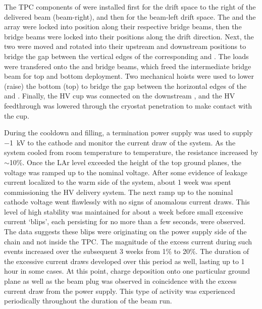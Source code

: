 The TPC components of  were installed first for the drift space to the right of the delivered beam (beam-right), and then for the beam-left drift space.
The  and the  array were locked into position along their respective bridge beams, then the bridge beams were locked into their positions along the drift direction.
Next, the two  were moved and rotated into their upstream and downstream positions to bridge the gap between the vertical edges of the corresponding  and .
The  loads were transfered onto the  and   bridge beams, which freed the intermediate bridge beam for top and bottom  deployment.
Two mechanical hoists were used to lower (raise) the bottom (top)  to bridge the gap between the horizontal edges of the  and .
Finally, the HV cup was connected on the downstream , and the HV feedthrough was lowered through the cryostat penetration to make contact with the cup.

During the cooldown and  filling, a  termination power supply was used to supply $-$\SI{1}{kV} to the cathode and monitor the current draw of the system.
As the system cooled from room temperature to  temperature, the resistance increased by $\sim$10\%.
Once the LAr level exceeded the height of the top ground planes, the voltage was ramped up to the nominal voltage.
After some evidence of leakage current localized to the warm side of the system, about 1 week was spent commissioning the HV delivery system.
The next ramp up to the nominal cathode voltage went flawlessly with no signs of anomalous current draws.
This level of high stability was maintained for about a week before small excessive current `blips', each persisting for no more than a few seconds, were observed.
The data suggests these blips were originating on the power supply side of the chain and not inside the TPC.
The magnitude of the excess current during such events increased over the subsequent 3 weeks from 1\% to 20\%.
The duration of the excessive current draws developed over this period as well, lasting up to 1 hour in some cases.
At this point, charge deposition onto one particular ground plane as well as the beam plug was observed in coincidence with the excess current draw from the power supply.
This type of activity was experienced periodically throughout the duration of the  beam run.

